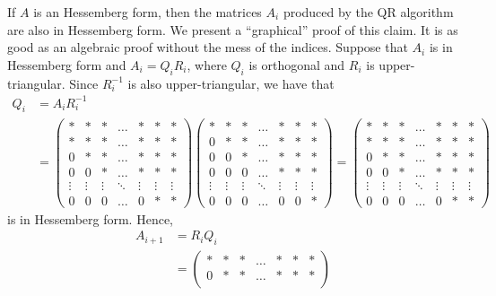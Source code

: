 \begin{rmk}
If $A$ is an Hessemberg form, then the matrices $A_i$ produced by the QR
algorithm are also in Hessemberg form.  We present a ``graphical''
proof of this claim.  It is as good as an algebraic proof without the
mess of the indices.  Suppose that $A_i$ is in Hessemberg
form and $A_i = Q_iR_i$, where $Q_i$ is orthogonal and $R_i$ is
upper-triangular.  Since $R_i^{-1}$ is also upper-triangular, we have that
\begin{align*}
Q_i &= A_i R_i^{-1} \\
&= \begin{pmatrix}
* & * & * & \ldots & * & * & * \\
* & * & * & \ldots & * & * & * \\
0 & * & * & \ldots & * & * & * \\
0 & 0 & * & \ldots & * & * & * \\
\vdots & \vdots & \vdots & \ddots & \vdots & \vdots & \vdots \\
0 & 0 & 0 & \ldots & 0 & * & *
\end{pmatrix}
\begin{pmatrix}
* & * & * & \ldots & * & * & * \\
0 & * & * & \ldots & * & * & * \\
0 & 0 & * & \ldots & * & * & * \\
0 & 0 & 0 & \ldots & * & * & * \\
\vdots & \vdots & \vdots & \ddots & \vdots & \vdots & \vdots \\
0 & 0 & 0 & \ldots & 0 & 0 & *
\end{pmatrix}
=
\begin{pmatrix}
* & * & * & \ldots & * & * & * \\
* & * & * & \ldots & * & * & * \\
0 & * & * & \ldots & * & * & * \\
0 & 0 & * & \ldots & * & * & * \\
\vdots & \vdots & \vdots & \ddots & \vdots & \vdots & \vdots \\
0 & 0 & 0 & \ldots & 0 & * & *
\end{pmatrix}
\end{align*}
is in Hessemberg form.  Hence,
\begin{align*}
A_{i+1} &= R_i Q_i \\
&= \begin{pmatrix}
* & * & * & \ldots & * & * & * \\
0 & * & * & \ldots & * & * & * \\

\end{pmatrix}
\end{align*}
\end{rmk}
